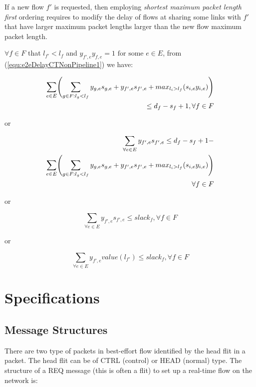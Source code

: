 \documentclass[conference, twocolumn]{IEEEtran}
\theoremstyle{definition}
\begin{document}
If a new flow $f'$ is requested, then employing {\em shortest maximum packet
length first} ordering requires to modify the delay of flows at sharing some
links with $f'$ that have larger maximum packet lengths larger than the new flow
maximum packet length. 

$\forall f \in F$  that $l_{f'} < l_f$ and $y_{f',e}y_{f,e}=1 \mbox{ for some }
e \in E$, from (\ref{equ:e2eDelayCTNonPipeline1}) we have:

\begin{eqnarray}\label{equ:e2eDelayModification}
\sum_{e \in E} \Biggl(\sum_{g \in F:l_g <
l_f}y_{g,e}s_{g,e}+y_{f',e}s_{f',e}+max_{l_i>l_f}(s_{i,e}y_{i,e})\Biggr)\notag
\\ \leq d_f-s_f + 1, \forall f \in F
\end{eqnarray}

or

\begin{eqnarray}\label{equ:e2eDelayModificatio2}
\sum_{\forall e \in E}y_{f',e}s_{f',e} \leq d_f-s_f + 1 - \notag \\ 
\sum_{e \in E} \Biggl(\sum_{g \in F:l_g <
l_f}y_{g,e}s_{g,e}+y_{f',e}s_{f',e}+max_{l_i>l_f}(s_{i,e}y_{i,e})\Biggr) \notag
\\ \forall f \in F
\end{eqnarray}

or

\begin{equation}\label{equ:e2eDelayModificatio3}
\sum_{\forall e \in E}y_{f',e}s_{f',e} \leq slack_f, \forall f \in F
\end{equation}

or

\begin{equation}\label{equ:e2eDelayModificatio4}
\sum_{\forall e \in E}y_{f',e}value(l_{f'}) \leq slack_f, \forall f \in F
\end{equation}

\section{Specifications}
\subsection{Message Structures}

There are two type of packets in best-effort flow identified by the head flit
in a packet. The head flit can be of CTRL (control) or HEAD (normal) type. The
structure of a REQ message (this is often a flit) to set up a real-time flow on the network is:
\end{document}
